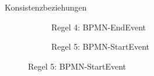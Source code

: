 \begin{frame}{Konsistenzbeziehungen}
\begin{figure}
\begin{subfigure}{0.3\textwidth}
\begin{adjustbox}{width=0.8\linewidth,center}
\begin{tikzpicture}
          \end{tikzpicture}
        \end{adjustbox}
        \caption*{\tiny{Regel 4: BPMN-EndEvent}}%
    \end{subfigure}
    \hspace{16pt}
    \begin{subfigure}{0.3\textwidth}
        \vspace{4pt}
        \centering
        \begin{adjustbox}{width=0.8\linewidth,center}
        \end{adjustbox}
        \caption*{\tiny{Regel 5: BPMN-StartEvent}}%
    \end{subfigure}
  \end{figure}
\end{frame}

